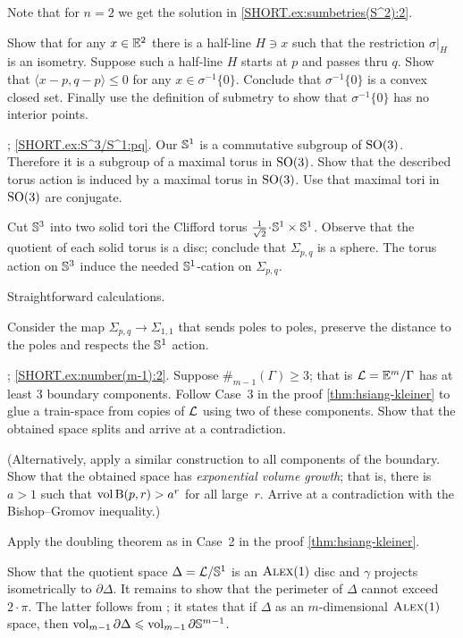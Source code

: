 Note that for $n=2$ we get the solution in \ref{SHORT.ex:sumbetries(S^2):2}.

Show that for any $x\in\mathbb{E}^2$ there is a half-line $H\ni x$ such that 
the restriction $\sigma|_H$ is an isometry.
Suppose such a half-line $H$ starts at $p$ and passes thru $q$.
Show that $\langle x-p,q-p \rangle\le 0$ for any $x\in \sigma^{-1}\{0\}$.
Conclude that $\sigma^{-1}\{0\}$ is a convex closed set.
Finally use the definition of submetry to show that  $\sigma^{-1}\{0\}$ has no interior points. 

\parbf{\ref{ex:S^3/S^1}};
\ref{SHORT.ex:S^3/S^1:pq}.
Our $\mathbb{S}^1$ is a commutative subgroup of $\mathrm{SO}(3)$.
Therefore it is a subgroup of a maximal torus in $\mathrm{SO}(3)$.
Show that the described torus action is induced by a maximal torus in $\mathrm{SO}(3)$.
Use that maximal tori in $\mathrm{SO}(3)$ are conjugate.

Cut $\mathbb{S}^3$ into two solid tori the Clifford torus $\tfrac1{\sqrt2}\cdot \SSS^1\times \SSS^1$.
Observe that the quotient of each solid torus is a disc;
conclude that $\Sigma_{p,q}$ is a sphere.
The torus action on $\mathbb{S}^3$ induce the needed $\mathbb{S}^1$-cation on $\Sigma_{p,q}$.

 Straightforward calculations.

Consider the map $\Sigma_{p,q}\to\Sigma_{1,1}$ that sends poles to poles,
preserve the distance to the poles and respects the $\mathbb{S}^1$ action.

\parbf{\ref{ex:number(m-1)}};
\ref{SHORT.ex:number(m-1):2}.
Suppose $\#_{m-1}(\Gamma)\ge 3$;
that is $\mathcal{L}=\mathbb{E}^m/\Gamma$ has at least 3 boundary components.
Follow Case~3 in the proof \ref{thm:hsiang-kleiner} to glue a train-space from copies of $\mathcal{L}$ using two of these components.
Show that the obtained space splits and arrive at a contradiction.

(Alternatively, apply a similar construction to all components of the boundary.
Show that the obtained space has {}\emph{exponential volume growth};
that is, there is $a>1$ such that $\operatorname{\rm vol}\nolimits \mathrm{B}{}(p,r)>a^r$ for all large~$r$.
Arrive at a contradiction with the Bishop--Gromov inequality.)

Apply the doubling theorem as in Case~2 in the proof \ref{thm:hsiang-kleiner}.

Show that the quotient space $\Delta=\mathcal{L}/\mathbb{S}^1$ is an $\textsc{Alex}(1)$ disc and $\gamma$ projects isometrically to $\partial\Delta$.
It remains to show that the perimeter of $\Delta$ cannot exceed $2\cdot\pi$.
The latter follows from \cite[3.3.5]{petrunin:survey};
it states that if $\Delta$ as an $m$-dimensional $\textsc{Alex}(1)$ space, then $\operatorname{\rm vol}\nolimits_{m-1}\partial \Delta\leqslant \operatorname{\rm vol}\nolimits_{m-1}\partial \mathbb{S}^{m-1}$.

